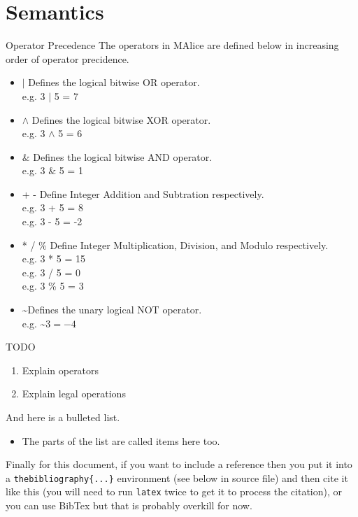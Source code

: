 \documentclass[a4wide, 11pt]{article}
\newcommand{\tab}{\hspace*{2em}}
\begin{document}
\section{Semantics}
Operator Precedence
The operators in MAlice are defined below in increasing order of operator precidence.

\begin{itemize}
	\item
	$|$ Defines the logical bitwise OR operator. 
	\\ \tab e.g. 3 $|$ 5 = 7
	\item
	$\land$ Defines the logical bitwise XOR operator. 
	\\ \tab e.g. 3 $\land$ 5 = 6
	\item
	$\&$ Defines the logical bitwise AND operator. 
	\\ \tab e.g. 3 $\&$ 5 = 1
	\item
	+ - Define Integer Addition and Subtration respectively. 
	\\ \tab e.g. 3 + 5 = 8 \\ \tab e.g. 3 - 5 = -2
	\item
	* / \% Define Integer Multiplication, Division, and Modulo respectively. 
	\\ \tab e.g. 3 * 5 = 15 \\ \tab e.g. 3 / 5 = 0 \\ \tab e.g. 3 \% 5 = 3
	\item
	\textasciitilde  Defines the unary logical NOT operator.
	\\ \tab e.g. \textasciitilde$ 3 = -4$
\end{itemize}
TODO

\begin{enumerate}
    \item
    Explain operators 
    \item
    Explain legal operations    
    
    
\end{enumerate}

And here is a bulleted list.

\begin{itemize}

    \item
    The parts of the list are called items here too.
    
\end{itemize}

Finally for this document, if you want to include a reference
then you put it into a \texttt{thebibliography\{...\}}
environment (see below in source file) and then 
cite it like this \cite{lamport94}
(you will need to run \texttt{latex} twice to get it to process the citation),
or you can use BibTex but that is probably overkill for now.
\end{document}

